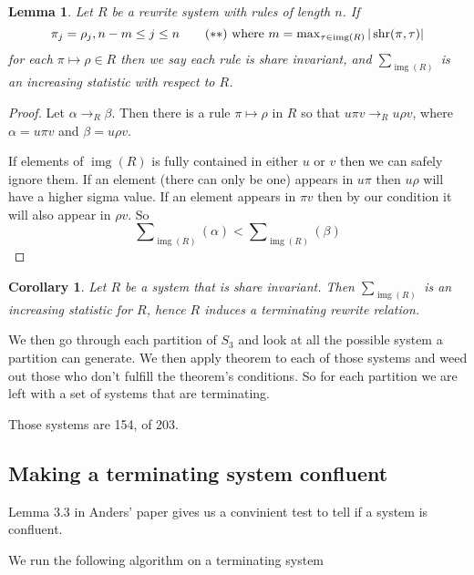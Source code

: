 \documentclass[openany, a4paper, 11pt, english]{article}
\newcommand{\patternrule}{ \mapsto \!}
\newtheorem{lemma}[theorem]{Lemma}
\newtheorem{corollary}[theorem]{Corollary}
\theoremstyle{definition}
\newcommand{\Sym}{S}
\DeclareMathOperator{\img}{img}
\DeclareMathOperator{\shr}{shr}
\begin{document}
\begin{lemma}
    Let $R$ be a rewrite system with rules of length $n$. If
    \[
        \pi_j = \rho_j, n-m \leq j \leq n \tag{$\ast\ast$} \  \textnormal{where}
        \ m = \max\nolimits_{\tau \in \img(R)} |\shr(\pi, \tau)|\label{shareinvariance}
    \]
    for each $\pi \patternrule \rho \in R$ then we say each rule is \emph{share
    invariant}, and $\sum_{\img(R)}$ is an increasing statistic with respect to $R$. 
\end{lemma}
\begin{proof}
    Let $\alpha \to_R \beta$. Then there is a rule $\pi \patternrule \rho$ in
    $R$ so that $u \pi v \to_R u \rho v$, where $\alpha = u \pi v$ and $\beta =
    u \rho v$. 

    If elements of $\img(R)$ is fully contained in either $u$ or $v$ then we
    can safely ignore them. If an element (there can only be one) appears in $u\pi$ then
    $u \rho$ will have a higher sigma value. If an element appears in $\pi v$
    then by our condition it will also appear in $\rho v$.
    So
    \[
        \sum\nolimits_{\img(R)}(\alpha) < \sum\nolimits_{\img(R)}(\beta)
    \]
\end{proof}

\begin{corollary}
    Let $R$ be a system that is share invariant. Then $\sum_{\img(R)}$ is an
    increasing statistic for $R$, hence $R$ induces a terminating rewrite relation.
\end{corollary}

We then go through each partition of $\Sym_3$ and look at all the possible
system a partition can generate. We then apply theorem to each of those systems
and weed out those who don't fulfill the theorem's conditions. So for each
partition we are left with a set of systems that are terminating.

Those systems are 154, of 203.

\subsection{Making a terminating system confluent}
Lemma $3.3$ in Anders' paper gives us a convinient test to tell if a system is
confluent. 

We run the following algorithm on a terminating system
\end{document}

